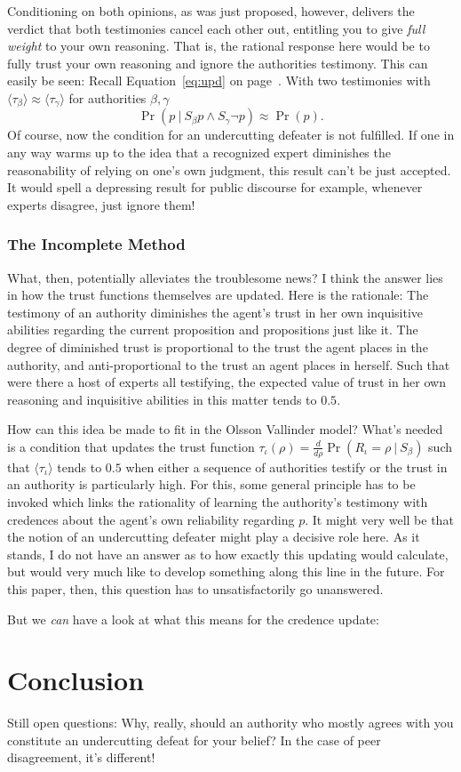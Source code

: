 \documentclass[11pt, a4paper]{scrartcl}
\newcommand{\given}[1][]{\:#1\vert\:}
\renewcommand{\i}[1]{\emph{#1}}
\begin{document}
Conditioning on both opinions, as was just proposed, however, delivers the verdict that both testimonies cancel each other out, entitling you to give \i{full weight} to your own reasoning. That is, the rational response here would be to fully trust your own reasoning and ignore the authorities testimony. This can easily be seen: Recall Equation~\ref{eq:upd} on page~\pageref{eq:upd}. With two testimonies with $\langle \tau_\beta \rangle \approx \langle \tau_\gamma \rangle$ for authorities $\beta, \gamma$
\[ \Pr(p \given S_\beta p \land S_\gamma \neg p) \approx \Pr(p). \] Of course, now the condition for an undercutting defeater is not fulfilled. If one in any way warms up to the idea that a recognized expert diminishes the reasonability of relying on one's own judgment, this result can't be just accepted. It would spell a depressing result for public discourse for example, whenever experts disagree, just ignore them!  

\subsubsection{The Incomplete Method}

What, then, potentially alleviates the troublesome news? I think the answer lies in how the trust functions themselves are updated. Here is the rationale: The testimony of an authority diminishes the agent's trust in her own inquisitive abilities regarding the current proposition and propositions just like it. The degree of diminished trust is proportional to the trust the agent places in the authority, and anti-proportional to the trust an agent places in herself. Such that were there a host of experts all testifying, the expected value of trust in her own reasoning and inquisitive abilities in this matter tends to $0.5$. 

How can this idea be made to fit in the Olsson Vallinder model? What's needed is a condition that updates the trust function $\tau_{\iota}(\rho) = \frac{d}{d\rho} \Pr(R_{\iota} = \rho \given S_{\beta})$ such that $\langle \tau_{\iota} \rangle$ tends to $0.5$ when either a sequence of authorities testify or the trust in an authority is particularly high. For this, some general principle has to be invoked which links the rationality of learning the authority's testimony with credences about the agent's own reliability regarding $p$. It might very well be that the notion of an undercutting defeater might play a decisive role here. As it stands, I do not have an answer as to how exactly this updating would calculate, but would very much like to develop something along this line in the future. For this paper, then, this question has to unsatisfactorily go unanswered. 

But we \i{can} have a look at what this means for the credence update:  

\section{Conclusion}
Still open questions: Why, really, should an authority who mostly agrees with you constitute an undercutting defeat for your belief? In the case of peer disagreement, it's different!  
\printbibliography{}
\end{document}
